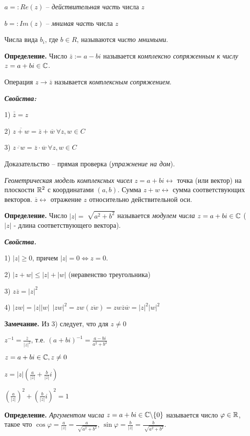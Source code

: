 $a =: Re(z)$ -- \textit{действительная часть} числа $z$

$b =: Im(z)$ -- \textit{мнимая часть} числа $z$

\bigskip
Числа вида $b_i$, где $b \in R$, называются \textit{чисто мнимыми}.

\bigskip
\textbf{Определение.} Число $\overline{z} := a - bi$ называется \textit{комплексно сопряженным к числу} $z=a+bi \in \mathbb{C}$.

Операция $z \rightarrow \overline{z}$ называется \textit{комплексным сопряжением}.

\bigskip
\textbf{\textit{Свойства:}}

1) $\overline{\overline{z}} = z$

2) $\overline{z + w} = \overline{z} + \overline{w} \ \forall z, w \in C$

3) $\overline{z \cdot w} = \overline{z} \cdot \overline{w} \ \forall z, w \in C$

Доказательство -- прямая проверка (\textit{упражнение на дом}).

\bigskip
\textit{Геометрическая модель комплексных чисел} $z = a + bi \leftrightarrow$ точка (или вектор) на плоскости $\mathbb{R}^2$ с координатами $(a, b)$. Сумма $z + w \leftrightarrow$ сумма соответствующих векторов. $\overline{z} \leftrightarrow$ отражение $z$ относительно действительной оси.

\bigskip
\textbf{Определение.} Число $|z| = \sqrt[]{a^2 + b^2}$ называется \textit{модулем числа} $z = a + bi \in \mathbb{C}$ ($|z|$ - длина соответствующего вектора).

\bigskip
\textbf{\textit{Свойства.}} 

1) $|z| \geq 0$, причем $|z| = 0 \Leftrightarrow z = 0$.

2) $ |z + w| \leq |z| + |w|$ (неравенство треугольника)

3) $z \overline{z} = |z|^2$

4) $|zw| = |z||w| \ \ |zw|^2 = zw(\overline{zw}) = zw \overline{z} \overline{w} =  |z|^2 |w|^2$

\bigskip
\textbf{Замечание.} Из 3) следует, что для $z \neq 0$

$z^{-1} = \frac{\overline{z}}{|z|^2}$, т.е. $(a + bi)^{-1} = \frac{a-bi}{a^2 + b^2}$

\bigskip
$z = a + bi \in \mathbb{C}, z \neq 0$

$z = |z| (\frac{a}{|z|} + \frac{b}{|z|}i)$

$(\frac{a}{|z|})^2 + (\frac{b}{|z|}i)^2 = 1$

\bigskip
\textbf{Определение.} \textit{Аргументом числа} $z = a + bi \in \mathbb{C} \backslash \{0\}$ называется число $\varphi \in \mathbb{R}$, такое что $\cos \varphi = \frac{a}{|z|} = \frac{a} {\sqrt[]{a^2 + b^2}}$, $\sin \varphi = \frac{b}{|z|} = \frac{b}{\sqrt[]{a^2 + b^2}}$.

